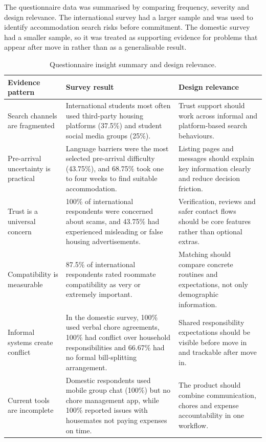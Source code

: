\documentclass[11pt,a4paper]{article}
\begin{document}
The questionnaire data was summarised by comparing frequency, severity and design relevance. The international survey had a larger sample and was used to identify accommodation search risks before commitment. The domestic survey had a smaller sample, so it was treated as supporting evidence for problems that appear after move in rather than as a generalisable result.

\begin{table}[H]
    \centering
    \small
    \caption{Questionnaire insight summary and design relevance.}
    \begin{tabularx}{\textwidth}{@{}L{3.1cm} Y Y@{}}
        \toprule
        Evidence pattern & Survey result & Design relevance\\
        \midrule
        Search channels are fragmented & International students most often used third-party housing platforms (37.5\%) and student social media groups (25\%). & Trust support should work across informal and platform-based search behaviours.\\
        Pre-arrival uncertainty is practical & Language barriers were the most selected pre-arrival difficulty (43.75\%), and 68.75\% took one to four weeks to find suitable accommodation. & Listing pages and messages should explain key information clearly and reduce decision friction.\\
        Trust is a universal concern & 100\% of international respondents were concerned about scams, and 43.75\% had experienced misleading or false housing advertisements. & Verification, reviews and safer contact flows should be core features rather than optional extras.\\
        Compatibility is measurable & 87.5\% of international respondents rated roommate compatibility as very or extremely important. & Matching should compare concrete routines and expectations, not only demographic information.\\
        Informal systems create conflict & In the domestic survey, 100\% used verbal chore agreements, 100\% had conflict over household responsibilities and 66.67\% had no formal bill-splitting arrangement. & Shared responsibility expectations should be visible before move in and trackable after move in.\\
        Current tools are incomplete & Domestic respondents used mobile group chat (100\%) but no chore management app, while 100\% reported issues with housemates not paying expenses on time. & The product should combine communication, chores and expense accountability in one workflow.\\
        \bottomrule
    \end{tabularx}
    \label{tabsurveyinsights}
\end{table}
\end{document}
